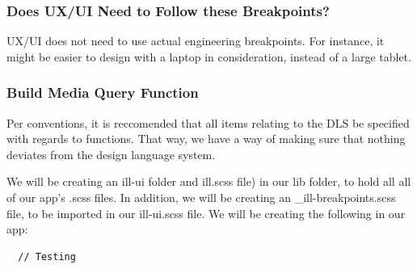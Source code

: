 \subsubsection{ Does UX/UI Need to Follow these Breakpoints? }
UX/UI does not need to use actual engineering breakpoints. For instance,
it might be easier to design with a laptop in consideration, instead of a large
tablet.

\subsubsection{ Build Media Query Function }
Per conventions, it is reccomended that all items relating to the DLS be
specified with regards to functions. That way, we have a way of making sure
that nothing deviates from the design language system.

We will be creating an ill-ui folder and ill.scss file) in our lib folder, to
hold all all of our app's .scss files. In addition, we will be creating an
 \_ill-breakpoints.scss file, to be imported in our ill-ui.scss file. We will be
creating the following in our app:

\begin{verbatim}
  // Testing
\end{verbatim}
